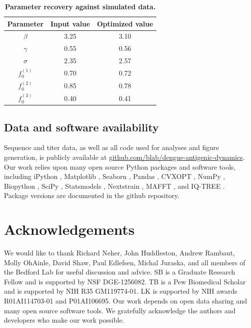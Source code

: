 \documentclass[11pt,oneside,letterpaper]{article}
\begin{document}
\begin{table}[ht!]
  \centering
  \caption{
    \textbf{Parameter recovery against simulated data.}
  }
  \label{simulation_parameters}
  \begin{tabular}{c c c}
    \hline
    Parameter     & Input value & Optimized value \\
    \hline
    $\beta$       & 3.25        & 3.10 \\
    $\gamma$      & 0.55        & 0.56 \\
    $\sigma$      & 2.35        & 2.57 \\
    $f_{0}^{(1)}$ & 0.70        & 0.72 \\
    $f_{0}^{(2)}$ & 0.85        & 0.78 \\
    $f_{0}^{(3)}$ & 0.40        & 0.41 \\
    \hline
  \end{tabular}
\end{table}


\subsection*{Data and software availability}
Sequence and titer data, as well as all code used for analyses and figure generation, is publicly available at \href{https://github.com/blab/dengue-antigenic-dynamics}{github.com/blab/dengue-antigenic-dynamics}.
Our work relies upon many open source Python packages and software tools, including iPython \cite{perez2007ipython}, Matplotlib \cite{Hunter2007computing}, Seaborn \citep{waskomseaborn}, Pandas \cite{mckinney2010data}, CVXOPT \cite{andersen2013cvxopt}, NumPy \cite{van2011numpy,gao2012implementing}, Biopython \cite{cock2009biopython}, SciPy \cite{jones2001scipy}, Statsmodels \cite{seabold2010statsmodels}, Nextstrain \cite{hadfield2018nextstrain}, MAFFT \cite{katoh2013mafft}, and IQ-TREE \cite{nguyen2014iq}.
Package versions are documented in the github repository.

\section*{Acknowledgements}
We would like to thank Richard Neher, John Huddleston, Andrew Rambaut, Molly OhAinle, David Shaw, Paul Edlefsen, Michal Juraska, and all members of the Bedford Lab for useful discussion and advice.
SB is a Graduate Research Fellow and is supported by NSF DGE-1256082.
TB is a Pew Biomedical Scholar and is supported by NIH R35 GM119774-01.
LK is supported by NIH awards R01AI114703-01 and P01AI106695.
Our work depends on open data sharing and many open source software tools.
We gratefully acknowledge the authors and developers who make our work possible.
\end{document}
